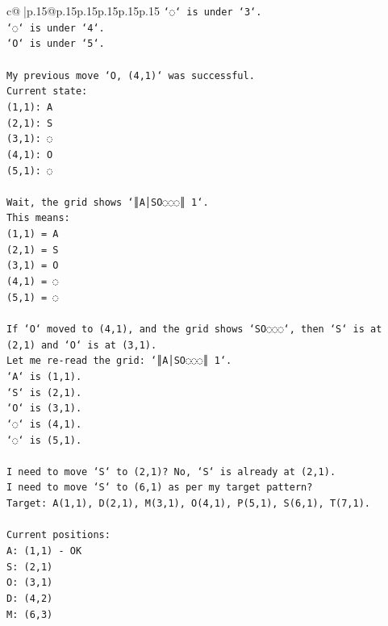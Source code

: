 \documentclass{article}
\begin{document}
{\begin{supertabular}{c@{$\;$}|p{.15\linewidth}@{}p{.15\linewidth}p{.15\linewidth}p{.15\linewidth}p{.15\linewidth}p{.15\linewidth}}
{{{\texttt{`◌` is under `3`.} \\
\texttt{`◌` is under `4`.} \\
\texttt{`O` is under `5`.} \\
\\ 
\texttt{My previous move `O, (4,1)` was successful.} \\
\texttt{Current state:} \\
\texttt{(1,1): A} \\
\texttt{(2,1): S} \\
\texttt{(3,1): ◌} \\
\texttt{(4,1): O} \\
\texttt{(5,1): ◌} \\
\\ 
\texttt{Wait, the grid shows `║A│SO◌◌◌║ 1`.} \\
\texttt{This means:} \\
\texttt{(1,1) = A} \\
\texttt{(2,1) = S} \\
\texttt{(3,1) = O} \\
\texttt{(4,1) = ◌} \\
\texttt{(5,1) = ◌} \\
\\ 
\texttt{If `O` moved to (4,1), and the grid shows `SO◌◌◌`, then `S` is at (2,1) and `O` is at (3,1).} \\
\texttt{Let me re{-}read the grid: `║A│SO◌◌◌║ 1`.} \\
\texttt{`A` is (1,1).} \\
\texttt{`S` is (2,1).} \\
\texttt{`O` is (3,1).} \\
\texttt{`◌` is (4,1).} \\
\texttt{`◌` is (5,1).} \\
\\ 
\texttt{I need to move `S` to (2,1)? No, `S` is already at (2,1).} \\
\texttt{I need to move `S` to (6,1) as per my target pattern?} \\
\texttt{Target: A(1,1), D(2,1), M(3,1), O(4,1), P(5,1), S(6,1), T(7,1).} \\
\\ 
\texttt{Current positions:} \\
\texttt{A: (1,1) {-} OK} \\
\texttt{S: (2,1)} \\
\texttt{O: (3,1)} \\
\texttt{D: (4,2)} \\
\texttt{M: (6,3)} \\
}}}
\end{supertabular}}
\end{document}

